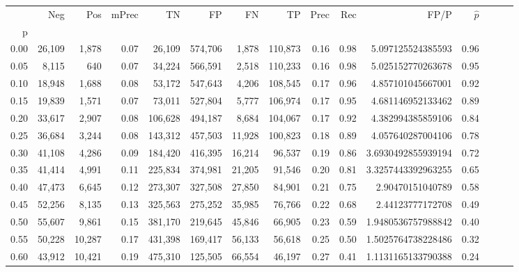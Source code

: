 \begin{tabular}{rrrrrrrrrrrrrrr}
\toprule
{} &     Neg &     Pos & mPrec &       TN &       FP &       FN &       TP &  Prec &   Rec &                  FP/P & $\hat{p}$ \\
p    &         &         &       &          &          &          &          &       &       &                       &           \\
\midrule
0.00 &  26,109 &   1,878 &  0.07 &   26,109 &  574,706 &    1,878 &  110,873 &  0.16 &  0.98 &     5.097125524385593 &      0.96 \\
0.05 &   8,115 &     640 &  0.07 &   34,224 &  566,591 &    2,518 &  110,233 &  0.16 &  0.98 &     5.025152770263678 &      0.95 \\
0.10 &  18,948 &   1,688 &  0.08 &   53,172 &  547,643 &    4,206 &  108,545 &  0.17 &  0.96 &     4.857101045667001 &      0.92 \\
0.15 &  19,839 &   1,571 &  0.07 &   73,011 &  527,804 &    5,777 &  106,974 &  0.17 &  0.95 &     4.681146952133462 &      0.89 \\
0.20 &  33,617 &   2,907 &  0.08 &  106,628 &  494,187 &    8,684 &  104,067 &  0.17 &  0.92 &     4.382994385859106 &      0.84 \\
0.25 &  36,684 &   3,244 &  0.08 &  143,312 &  457,503 &   11,928 &  100,823 &  0.18 &  0.89 &     4.057640287004106 &      0.78 \\
0.30 &  41,108 &   4,286 &  0.09 &  184,420 &  416,395 &   16,214 &   96,537 &  0.19 &  0.86 &    3.6930492855939194 &      0.72 \\
0.35 &  41,414 &   4,991 &  0.11 &  225,834 &  374,981 &   21,205 &   91,546 &  0.20 &  0.81 &    3.3257443392963255 &      0.65 \\
0.40 &  47,473 &   6,645 &  0.12 &  273,307 &  327,508 &   27,850 &   84,901 &  0.21 &  0.75 &      2.90470151040789 &      0.58 \\
0.45 &  52,256 &   8,135 &  0.13 &  325,563 &  275,252 &   35,985 &   76,766 &  0.22 &  0.68 &      2.44123777172708 &      0.49 \\
0.50 &  55,607 &   9,861 &  0.15 &  381,170 &  219,645 &   45,846 &   66,905 &  0.23 &  0.59 &    1.9480536757988842 &      0.40 \\
0.55 &  50,228 &  10,287 &  0.17 &  431,398 &  169,417 &   56,133 &   56,618 &  0.25 &  0.50 &    1.5025764738228486 &      0.32 \\
0.60 &  43,912 &  10,421 &  0.19 &  475,310 &  125,505 &   66,554 &   46,197 &  0.27 &  0.41 &    1.1131165133790388 &      0.24 \\

\end{tabular}
